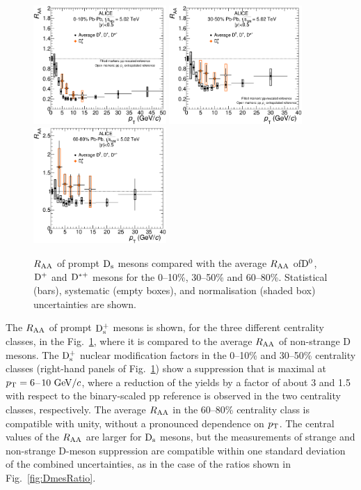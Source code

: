 \begin{figure}[!h]
\centering
\includegraphics[angle=0, width=0.45\textwidth]{FigCap5/DmesonAverageDs_010_.eps}
\includegraphics[angle=0, width=0.45\textwidth]{FigCap5/DmesonAverageDs_3050_.eps}
\includegraphics[angle=0, width=0.45\textwidth]{FigCap5/DmesonAverageDs_6080_.eps}
 \caption{$R_{\rm AA}$ 
  of prompt ${\rm D_s}$ mesons 
  compared with the average $R_{\rm AA}$ of${\rm D^0}$, ${\rm D^+}$ and ${\rm D^{*+}}$ mesons for the 
0--10\%, 30--50\% and 60--80\%. 
Statistical (bars),  systematic (empty boxes), and normalisation (shaded box) 
uncertainties are shown.}
 \label{fig:DmesRaa} 
\end{figure} 



The $R_{\rm AA}$ of prompt ${\rm D_s^+}$ mesons is shown, for the three different centrality classes,
in the Fig.~\ref{fig:DmesRaa}, where it is compared to the average $R_{\rm AA}$ of non-strange 
D mesons. The ${\rm D_s^+}$ nuclear modification factors in the 0--10\% 
and 30--50\% centrality classes (right-hand panels of 
Fig.~\ref{fig:DmesRaa}) show a suppression that is
maximal at $p_{\rm T}=6$--$10~\mathrm{GeV}/c$, where a reduction of the yields by
a factor of about 3 and 1.5 with respect to the binary-scaled
 pp reference is observed in the two centrality classes, respectively.
The average $R_{\rm AA}$ in the 60--80\% centrality class is compatible 
with unity, without a pronounced dependence on $p_{\rm T}$.
 The central values of the $R_{\rm AA}$ are larger for ${\rm D_s}$ mesons, but the measurements 
 of strange and non-strange D-meson suppression are 
compatible within one standard deviation of the combined 
uncertainties, as in the case of the ratios shown in Fig.~\ref{fig:DmesRatio}.


